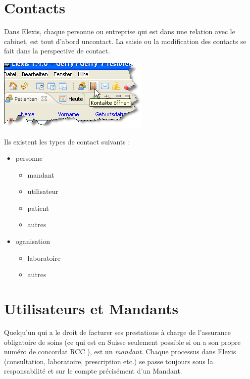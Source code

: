
\section{Contacts}
\label{kontakt}
Dans Elexis, chaque personne ou entreprise qui est dans une relation avec le cabinet, est
tout d'abord un\glqq contact\grqq{}. La saisie ou la modification des contacts se fait dans la perspective de contact.
\begin{flushleft}
    \includegraphics{images/contactperspective}
\end{flushleft}


Ils existent les types de contact suivants :
\begin{itemize}
  \item personne
	\begin{itemize}
  		\item mandant
  		\item utilisateur
  		\item patient
  		\item autres
    \end{itemize}
    \item{oganisation}
    \begin{itemize}
      \item{laboratoire}
      \item {autres}
    \end{itemize}
\end{itemize}


\section{Utilisateurs et Mandants}
Quelqu'un qui a le droit de facturer ses prestations à charge de l'assurance obligatoire de soins (ce qui est en Suisse seulement possible si on a son propre numéro de concordat RCC ), est un \textit{mandant}. Chaque processus dans Elexis (consultation, laboratoire, prescription etc.) se passe toujours sous la responsabilité et sur le compte précisément d'un Mandant. 


